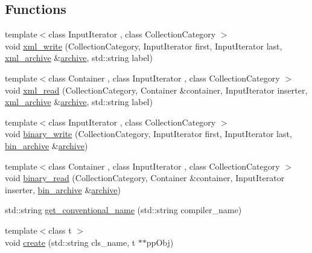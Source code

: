 \subsection*{Functions}
\begin{DoxyCompactItemize}
\item 
{\footnotesize template$<$class Input\+Iterator , class Collection\+Category $>$ }\\void \hyperlink{namespaceeternity_a839ed28b40afacc8ece1c9198aff5117}{xml\+\_\+write} (Collection\+Category, Input\+Iterator first, Input\+Iterator last, \hyperlink{classeternity_1_1xml__archive}{xml\+\_\+archive} \&\hyperlink{classeternity_1_1archive}{archive}, std\+::string label)
\item 
{\footnotesize template$<$class Container , class Input\+Iterator , class Collection\+Category $>$ }\\void \hyperlink{namespaceeternity_acbfdd0b95d15efaa347565f99effa8c3}{xml\+\_\+read} (Collection\+Category, Container \&container, Input\+Iterator inserter, \hyperlink{classeternity_1_1xml__archive}{xml\+\_\+archive} \&\hyperlink{classeternity_1_1archive}{archive}, std\+::string label)
\item 
{\footnotesize template$<$class Input\+Iterator , class Collection\+Category $>$ }\\void \hyperlink{namespaceeternity_a60ba54c971ad5c7de37fa57de8b3fd4c}{binary\+\_\+write} (Collection\+Category, Input\+Iterator first, Input\+Iterator last, \hyperlink{classeternity_1_1bin__archive}{bin\+\_\+archive} \&\hyperlink{classeternity_1_1archive}{archive})
\item 
{\footnotesize template$<$class Container , class Input\+Iterator , class Collection\+Category $>$ }\\void \hyperlink{namespaceeternity_a4bd77f03b6e8ea105a1b7a8d4e245fbe}{binary\+\_\+read} (Collection\+Category, Container \&container, Input\+Iterator inserter, \hyperlink{classeternity_1_1bin__archive}{bin\+\_\+archive} \&\hyperlink{classeternity_1_1archive}{archive})
\item 
std\+::string \hyperlink{namespaceeternity_a5f792170a26f719b53ffeb502cdd2344}{get\+\_\+conventional\+\_\+name} (std\+::string compiler\+\_\+name)
\item 
{\footnotesize template$<$class t $>$ }\\void \hyperlink{namespaceeternity_a18dc40145658dda3be79014257e1176b}{create} (std\+::string cls\+\_\+name, t $\ast$$\ast$pp\+Obj)
\end{DoxyCompactItemize}


